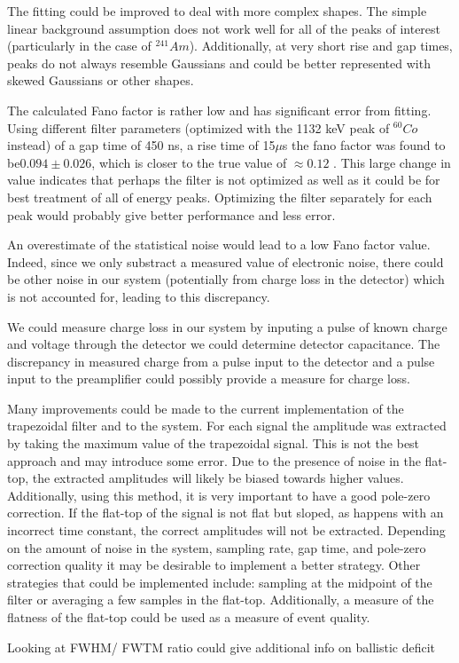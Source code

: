 The fitting could be improved to deal with more complex shapes. The simple linear background assumption does not work well for all of the peaks of interest (particularly in the case of  ${}^{241}Am$). Additionally, at very short rise and gap times, peaks do not always resemble Gaussians and could be better represented with skewed Gaussians or other shapes. 

The calculated Fano factor is rather low and has significant error from fitting. Using different filter parameters (optimized with the 1132 keV peak of ${}^{60}Co$ instead) of a gap time of 450 ns, a rise time of 15$\mu$s the fano factor was found to be$ 0.094 \pm 0.026$, which is closer to the true value of $\approx 0.12$ \cite{Knoll}. This large change in value indicates that perhaps the filter is not optimized as well as it could be for best treatment of all of energy peaks. Optimizing the filter separately for each peak would probably give better performance and less error.

An overestimate of the statistical noise would lead to a low Fano factor value. Indeed, since we only substract a measured value of electronic noise, there could be other noise in our system (potentially from charge loss in the detector) which is not accounted for, leading to this discrepancy.

We could measure charge loss in our system by inputing a pulse of known charge and voltage through the detector we could determine detector capacitance. The discrepancy in measured charge from a pulse input to the detector and a pulse input to the preamplifier could possibly provide a measure for charge loss.

Many improvements could be made to the current implementation of the trapezoidal filter and to the system. For each signal the amplitude was extracted by taking the maximum value of the trapezoidal signal. This is not the best approach and may introduce some error. Due to the presence of noise in the flat-top, the extracted amplitudes will likely be biased towards higher values. Additionally, using this method, it is very important to have a good pole-zero correction. If the flat-top of the signal is not flat but sloped, as happens with an incorrect time constant, the correct amplitudes will not be extracted. Depending on the amount of noise in the system, sampling rate, gap time, and pole-zero correction quality it may be desirable to implement a better strategy. Other strategies that could be implemented include: sampling at the midpoint of the filter or averaging a few samples in the flat-top. Additionally, a measure of the flatness of the flat-top could be used as a measure of event quality.

Looking at FWHM/ FWTM ratio could give additional info on ballistic deficit

